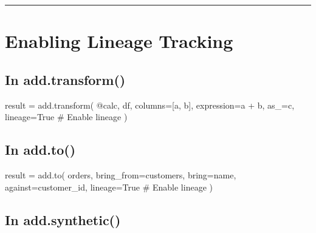 \documentclass[
  letterpaper,
]{scrbook}
\newenvironment{Shaded}{\begin{snugshade}}{\end{snugshade}}
\newcommand{\CommentTok}[1]{\textcolor[rgb]{0.37,0.37,0.37}{#1}}
\newcommand{\NormalTok}[1]{\textcolor[rgb]{0.00,0.23,0.31}{#1}}
\newcommand{\OperatorTok}[1]{\textcolor[rgb]{0.37,0.37,0.37}{#1}}
\newcommand{\StringTok}[1]{\textcolor[rgb]{0.13,0.47,0.30}{#1}}
\newcommand{\VariableTok}[1]{\textcolor[rgb]{0.07,0.07,0.07}{#1}}
\begin{document}
\begin{center}\rule{0.5\linewidth}{0.5pt}\end{center}

\section{Enabling Lineage Tracking}\label{enabling-lineage-tracking}

\subsection{In add.transform()}\label{in-add.transform}

\begin{Shaded}
\begin{Highlighting}[]
\NormalTok{result }\OperatorTok{=}\NormalTok{ add.transform(}
    \StringTok{\textquotesingle{}@calc\textquotesingle{}}\NormalTok{,}
\NormalTok{    df,}
\NormalTok{    columns}\OperatorTok{=}\NormalTok{[}\StringTok{\textquotesingle{}a\textquotesingle{}}\NormalTok{, }\StringTok{\textquotesingle{}b\textquotesingle{}}\NormalTok{],}
\NormalTok{    expression}\OperatorTok{=}\StringTok{\textquotesingle{}a + b\textquotesingle{}}\NormalTok{,}
\NormalTok{    as\_}\OperatorTok{=}\StringTok{\textquotesingle{}c\textquotesingle{}}\NormalTok{,}
\NormalTok{    lineage}\OperatorTok{=}\VariableTok{True}  \CommentTok{\# Enable lineage}
\NormalTok{)}
\end{Highlighting}
\end{Shaded}

\subsection{In add.to()}\label{in-add.to}

\begin{Shaded}
\begin{Highlighting}[]
\NormalTok{result }\OperatorTok{=}\NormalTok{ add.to(}
\NormalTok{    orders,}
\NormalTok{    bring\_from}\OperatorTok{=}\NormalTok{customers,}
\NormalTok{    bring}\OperatorTok{=}\StringTok{\textquotesingle{}name\textquotesingle{}}\NormalTok{,}
\NormalTok{    against}\OperatorTok{=}\StringTok{\textquotesingle{}customer\_id\textquotesingle{}}\NormalTok{,}
\NormalTok{    lineage}\OperatorTok{=}\VariableTok{True}  \CommentTok{\# Enable lineage}
\NormalTok{)}
\end{Highlighting}
\end{Shaded}

\subsection{In add.synthetic()}\label{in-add.synthetic}
\end{document}
